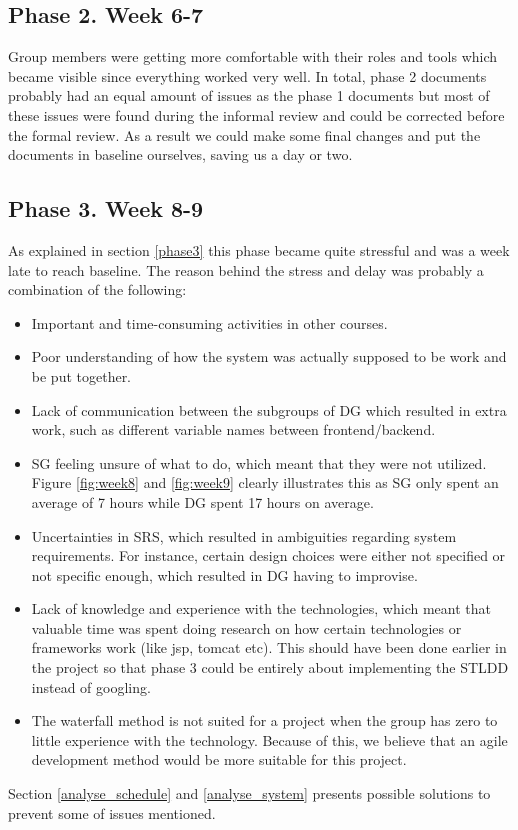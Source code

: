 \documentclass{article}
\begin{document}
    \subsection{Phase 2. Week 6-7}
        Group members were getting more comfortable with their roles and
        tools which became visible since everything worked very well. In total, phase 2 documents probably had an equal amount of issues as the phase 1 documents but
        most of these issues were found during the informal review and could be corrected before the formal review.
        As a result we could make some final changes and put the documents in baseline ourselves, saving us a day or two.
        
    \subsection{Phase 3. Week 8-9 \label{analys_phase3}}
        As explained in section \ref{phase3} this phase became quite stressful and 
        was a week late to reach baseline. The reason behind the stress and delay was
        probably a combination of the following:
        \begin{itemize}
            \item Important and time-consuming activities in other courses.
            \item Poor understanding of how the system was actually supposed to be work and
                    be put together.
            \item Lack of communication between the subgroups of DG which resulted in
                    extra work, such as different variable names between frontend/backend.
            \item SG feeling unsure of what to do, which meant that they were not utilized.
                    Figure \ref{fig:week8} and \ref{fig:week9} clearly illustrates this as
                    SG only spent an average of 7 hours while DG spent 17 hours on average.
            \item Uncertainties in SRS, which resulted in ambiguities regarding system requirements.
                    For instance, certain design choices were either not specified or not
                    specific enough, which resulted in DG having to improvise.
            \item Lack of knowledge and experience with the technologies, which meant that valuable time
                    was spent doing research on how certain technologies or frameworks work (like jsp, tomcat etc). This should have been done earlier in the project so that phase 3 could be entirely about implementing the STLDD instead of googling.
            \item The waterfall method is not suited for a project when the group has zero to little experience with the technology. Because of this, we believe that an agile development method would be more suitable for this project.
        \end{itemize}
        \noindent
        Section \ref{analyse_schedule} and \ref{analyse_system} presents possible solutions to prevent some of issues mentioned.
    
\end{document}
